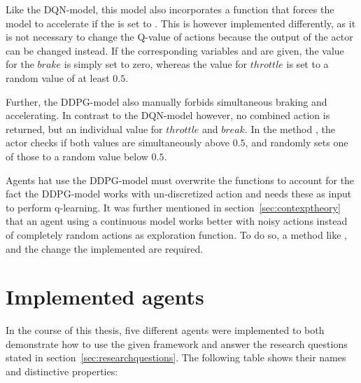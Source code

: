 Like the DQN-model, this model also incorporates a function that forces the model to accelerate if the  is set to . This is however implemented differently, as it is not necessary to change the Q-value of actions because the output of the actor can be changed instead. If the corresponding variables  and  are given, the value for the $brake$ is simply set to zero, whereas the value for $throttle$ is set to a random value of at least $0.5$. 

Further, the DDPG-model also manually forbids simultaneous braking and accelerating. In contrast to the DQN-model however, no combined action is returned, but an individual value for $throttle$ and $break$. In the method , the actor checks if both values are simultaneously above $0.5$, and randomly sets one of those to a random value below $0.5$.

Agents hat use the DDPG-model must overwrite the functions  to account for the fact the DDPG-model works with un-discretized action and needs these as input to perform q-learning. 
It was further mentioned in section~\ref{sec:contexptheory} that an agent using a continuous model works better with noisy actions instead of completely random actions as exploration function. To do so, a method like , and the change the implemented  are required.

\section{Implemented agents}

In the course of this thesis, five different agents were implemented to both demonstrate how to use the given framework and answer the research questions stated in section~\ref{sec:researchquestions}.  The following table shows their names and distinctive properties: 


